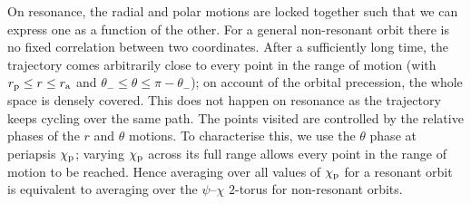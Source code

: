 On resonance, the radial and polar motions are locked together such that we can express one as a function of the other. For a general non-resonant orbit there is no fixed correlation between two coordinates. After a sufficiently long time, the trajectory comes arbitrarily close to every point in the range of motion (with $r_\mathrm{p} \leq r \leq r_\mathrm{a}$ and $\theta_- \leq \theta \leq \pi - \theta_-$); on account of the orbital precession, the whole space is densely covered. This does not happen on resonance as the trajectory keeps cycling over the same path. The points visited are controlled by the relative phases of the $r$ and $\theta$ motions. To characterise this, we use the $\theta$ phase at periapsis $\chi_\mathrm{p}$; varying $\chi_\mathrm{p}$ across its full range allows every point in the range of motion to be reached. Hence averaging over all values of $\chi_\mathrm{p}$ for a resonant orbit is equivalent to averaging over the $\psi$--$\chi$ $2$-torus for non-resonant orbits.

